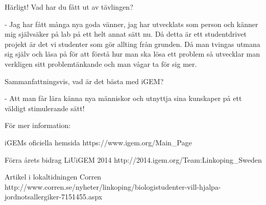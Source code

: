 Härligt! Vad har du fått ut av tävlingen?

- Jag har fått många nya goda vänner, jag har utvecklats som person
  och känner mig självsäker på lab på ett helt annat sätt nu. Då detta
  är ett studentdrivet projekt är det vi studenter som gör allting
  från grunden. Då man tvingas utmana sig själv och läsa på för att
  förstå hur man ska lösa ett problem så utvecklar man verkligen sitt
  problemtänkande och man vågar ta för sig mer.

Sammanfattningsvis, vad är det bästa med iGEM?

- Att man får lära känna nya människor och utnyttja sina kunskaper på
  ett väldigt stimulerande sätt!



För mer information:

iGEMs oficiella hemsida
https://www.igem.org/Main_Page

Förra årets bidrag LiUiGEM 2014
http://2014.igem.org/Team:Linkoping_Sweden

Artikel i lokaltidningen Corren
http://www.corren.se/nyheter/linkoping/biologistudenter-vill-hjalpa-jordnotsallergiker-7151455.aspx
